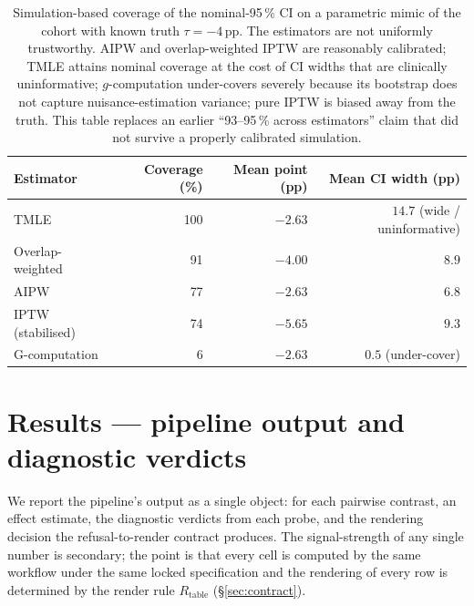 \documentclass[11pt,a4paper]{article}
\begin{document}
\begin{table}[H]
  \centering
  \small
  \caption{Simulation-based coverage of the nominal-95\,\% CI on a parametric mimic of the cohort with known truth $\tau = -4$\,pp. The estimators are not uniformly trustworthy. AIPW and overlap-weighted IPTW are reasonably calibrated; TMLE attains nominal coverage at the cost of CI widths that are clinically uninformative; $g$-computation under-covers severely because its bootstrap does not capture nuisance-estimation variance; pure IPTW is biased away from the truth. This table replaces an earlier ``93--95\,\% across estimators'' claim that did not survive a properly calibrated simulation.}
  \label{tab:coverage}
  \begin{tabular}{lrrr}
    \toprule
    Estimator           & Coverage (\%) & Mean point (pp) & Mean CI width (pp) \\
    \midrule
    TMLE                & 100 & $-2.63$ & $14.7$ (wide / uninformative) \\
    Overlap-weighted    & 91  & $-4.00$ & $8.9$ \\
    AIPW                & 77  & $-2.63$ & $6.8$ \\
    IPTW (stabilised)   & 74  & $-5.65$ & $9.3$ \\
    G-computation       & 6   & $-2.63$ & $0.5$ (under-cover) \\
    \bottomrule
  \end{tabular}
\end{table}

\section{Results --- pipeline output and diagnostic verdicts}\label{sec:summary}

We report the pipeline's output as a single object: for each pairwise contrast, an effect estimate, the diagnostic verdicts from each probe, and the rendering decision the refusal-to-render contract produces. The signal-strength of any single number is secondary; the point is that every cell is computed by the same workflow under the same locked specification and the rendering of every row is determined by the render rule $R_{\text{table}}$ (\S\ref{sec:contract}).
\end{document}
